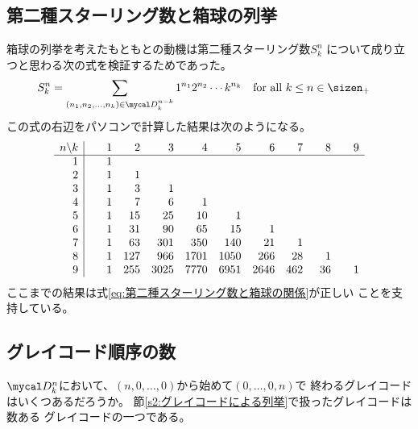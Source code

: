 \subsection{第二種スターリング数と箱球の列挙}
\label{s2:第二種スターリング数と箱球の列挙} %
	箱球の列挙を考えたもともとの動機は第二種スターリング数$S_k^n$
	について成り立つと思わる次の式を検証するためであった。
	\begin{equation}\label{eq:第二種スターリング数と箱球の関係}
	\begin{split} %
		S_k^n &= \sum_{(n_1,n_2,\dots,n_k)\in\hakodama_k^{n-k}}
			1^{n_1}2^{n_2}\cdots k^{n_k}
			\quad\text{for all }k\le n\in\sizen_+
	\end{split}\end{equation} %
	この式の右辺をパソコンで計算した結果は次のようになる。
	\begin{equation*}\begin{array}{r|@{\quad}rrrrrrrrrr} %
		n\backslash k & \hspace{1em}1 & \hspace{1em}2 & \hspace{1em}3 & \hspace{1em}4 & \hspace{1em}5 & \hspace{1em}6 & \hspace{1em}7 & \hspace{1em}8 & \hspace{1em}9 \\ \hline
		1 & 1 \\
		2 & 1 & 1 \\
		3 & 1 & 3 & 1 \\
		4 & 1 & 7 & 6 & 1 \\
		5 & 1 & 15 & 25 & 10 & 1 \\
		6 & 1 & 31 & 90 & 65 & 15 & 1 \\
		7 & 1 & 63 & 301 & 350 & 140 & 21 & 1 \\
		8 & 1 & 127 & 966 & 1701 & 1050 & 266 & 28 & 1 \\
		9 & 1 & 255 & 3025 & 7770 & 6951 & 2646 & 462 & 36 & 1 \\
	\end{array}\end{equation*} %
	ここまでの結果は式\eqref{eq:第二種スターリング数と箱球の関係}が正しい
	ことを支持している。
\subsection{グレイコード順序の数}\label{s2:グレイコード順序の数} %
	$\hakodama_k^n$において、$(n,0,\dots,0)$から始めて$(0,\dots,0,n)$で
	終わるグレイコードはいくつあるだろうか。
	節\ref{s2:グレイコードによる列挙}で扱ったグレイコードは数ある
	グレイコードの一つである。
%
